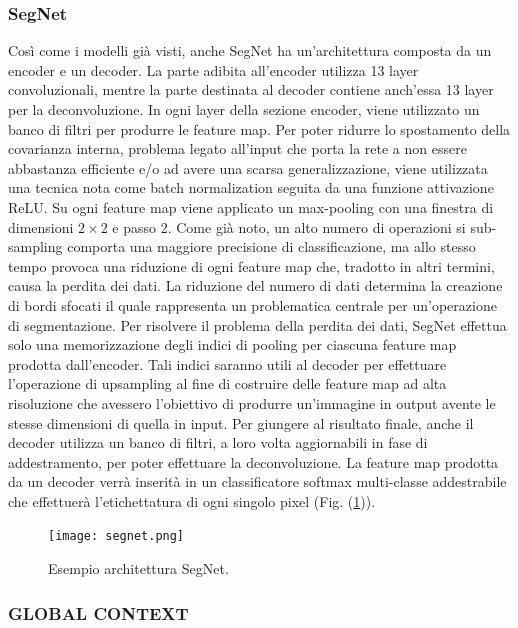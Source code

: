 \subsubsection{SegNet}
Così come i modelli già visti, anche SegNet ha un’architettura composta da un 
encoder e un decoder. La parte adibita all’encoder utilizza 13 layer convoluzionali, 
mentre la parte destinata al decoder contiene anch’essa 13 layer per la deconvoluzione. 
In ogni layer della sezione encoder, viene utilizzato un banco di filtri 
per produrre le feature map. Per poter ridurre lo spostamento della covarianza 
interna, problema legato all’input che porta la rete a non essere abbastanza 
efficiente e/o ad avere una scarsa generalizzazione, viene utilizzata una tecnica 
nota come batch normalization \cite{batchNorm} seguita da una funzione attivazione ReLU. Su 
ogni feature map viene applicato un max-pooling con una finestra di dimensioni 
$2\times 2$ e passo 2. Come già noto, un alto numero di operazioni si sub-sampling 
comporta una maggiore precisione di classificazione, ma allo stesso tempo provoca 
una riduzione di ogni feature map che, tradotto in altri termini, causa la perdita 
dei dati. La riduzione del numero di dati determina la creazione di bordi sfocati 
il quale rappresenta un problematica centrale per un’operazione di segmentazione. 
Per risolvere il problema della perdita dei dati, SegNet effettua solo una memorizzazione 
degli indici di pooling per ciascuna feature map prodotta dall’encoder. 
Tali indici saranno utili al decoder per effettuare l’operazione di upsampling 
al fine di costruire delle feature map ad alta risoluzione che avessero l’obiettivo di 
produrre un’immagine in output avente le stesse dimensioni di quella in input. 
Per giungere al risultato finale, anche il decoder utilizza un banco di filtri, a loro 
volta aggiornabili in fase di addestramento, per poter effettuare la deconvoluzione. 
La feature map prodotta da un decoder verrà inserità in un classificatore softmax 
multi-classe addestrabile che effettuerà l’etichettatura di ogni singolo pixel (Fig. (\ref{segnet})).
\begin{figure}
    \centering
    \texttt{[image: segnet.png]}
    \centering
    \caption{Esempio architettura SegNet.}
    \label{segnet}
\end{figure}

\subsubsection{GLOBAL CONTEXT}
